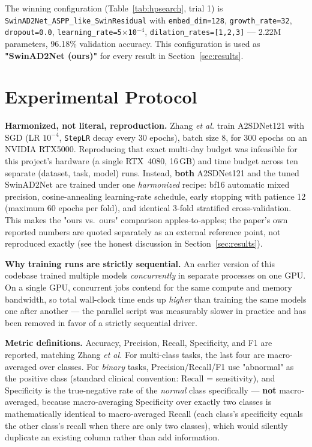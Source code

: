 \documentclass[10pt,twocolumn]{article}
\newcommand{\code}[1]{\texttt{\small #1}}
\begin{document}
The winning configuration (Table~\ref{tab:hpsearch}, trial 1) is \code{SwinAD2Net\_ASPP\_like\_SwinResidual} with \code{embed\_dim=128}, \code{growth\_rate=32}, \code{dropout=0.0}, \code{learning\_rate=5}$\times$\code{10}$^{-4}$, \code{dilation\_rates=[1,2,3]} --- 2.22M parameters, 96.18\% validation accuracy. This configuration is used as \textbf{"SwinAD2Net (ours)"} for every result in Section~\ref{sec:results}.

\section{Experimental Protocol}
\label{sec:protocol}

\textbf{Harmonized, not literal, reproduction.} Zhang \emph{et al.} train A2SDNet121 with SGD (LR $10^{-4}$, \code{StepLR} decay every 30 epochs), batch size 8, for 300 epochs on an NVIDIA RTX5000. Reproducing that exact multi-day budget was infeasible for this project's hardware (a single RTX~4080, 16\,GB) and time budget across ten separate (dataset, task, model) runs. Instead, \textbf{both} A2SDNet121 and the tuned SwinAD2Net are trained under one \emph{harmonized} recipe: bf16 automatic mixed precision, cosine-annealing learning-rate schedule, early stopping with patience 12 (maximum 60 epochs per fold), and identical 3-fold stratified cross-validation. This makes the "ours vs.\ ours" comparison apples-to-apples; the paper's own reported numbers are quoted separately as an external reference point, not reproduced exactly (see the honest discussion in Section~\ref{sec:results}).

\textbf{Why training runs are strictly sequential.} An earlier version of this codebase trained multiple models \emph{concurrently} in separate processes on one GPU. On a single GPU, concurrent jobs contend for the same compute and memory bandwidth, so total wall-clock time ends up \emph{higher} than training the same models one after another --- the parallel script was measurably slower in practice and has been removed in favor of a strictly sequential driver.

\textbf{Metric definitions.} Accuracy, Precision, Recall, Specificity, and F1 are reported, matching Zhang \emph{et al.} For multi-class tasks, the last four are macro-averaged over classes. For \emph{binary} tasks, Precision/Recall/F1 use "abnormal" as the positive class (standard clinical convention: Recall = sensitivity), and Specificity is the true-negative rate of the \emph{normal} class specifically --- \textbf{not} macro-averaged, because macro-averaging Specificity over exactly two classes is mathematically identical to macro-averaged Recall (each class's specificity equals the other class's recall when there are only two classes), which would silently duplicate an existing column rather than add information.
\end{document}
